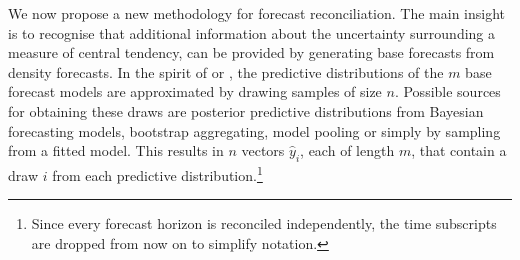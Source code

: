 \documentclass[a4paper,fleqn,11pt]{article}
\begin{document}
We now propose a new methodology for forecast reconciliation.  The main insight is to recognise that additional information about the uncertainty surrounding a measure of central tendency, can be provided by generating base forecasts from density forecasts.   In the spirit of \cite{Kapetanios2015} or \cite{Cesur2016}, the predictive distributions of the $m$ base forecast models are approximated by drawing samples of size $n$. Possible sources for obtaining these draws are posterior predictive distributions from Bayesian forecasting models, bootstrap aggregating, model pooling or simply by sampling from a fitted model. This results in $n$ vectors $\hat{y}_{i}$, each of length $m$, that contain a draw $i$ from each predictive distribution.\footnote{Since every forecast horizon is reconciled independently, the time subscripts are dropped from now on to simplify notation.} 
\end{document}
